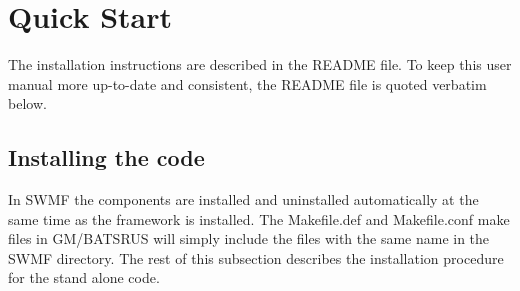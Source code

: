 \section{Quick Start \label{section:quick_start}}

The installation instructions are described in the README file.
To keep this user manual more up-to-date and consistent,
the README file is quoted verbatim below.




\subsection{Installing the code}

In SWMF the components are installed and uninstalled automatically 
at the same time as the framework is installed.
The Makefile.def and Makefile.conf make files in GM/BATSRUS will 
simply include the files with the same name in the SWMF directory.
The rest of this subsection describes the installation procedure
for the stand alone code.
 
